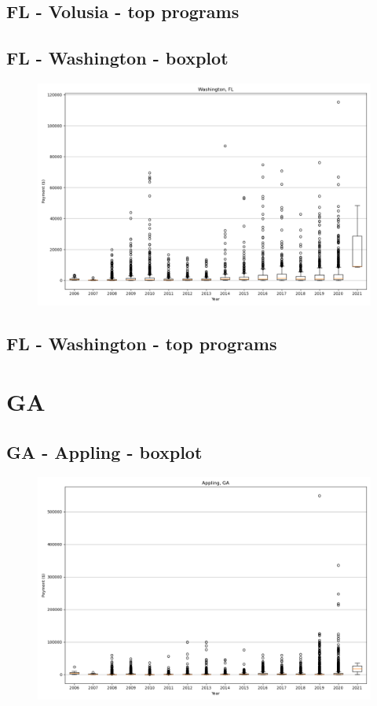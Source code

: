 \subsection*{FL - Volusia - top programs}

\newpage
\subsection*{FL - Washington - boxplot}
\begin{figure}[h]
\centering
\includegraphics[width=7in]{../output/boxplots/counties/Washington-FL_boxplot.png}
\end{figure}


\subsection*{FL - Washington - top programs}

\newpage
\section*{GA}
\subsection*{GA - Appling - boxplot}
\begin{figure}[h]
\centering
\includegraphics[width=7in]{../output/boxplots/counties/Appling-GA_boxplot.png}
\end{figure}


